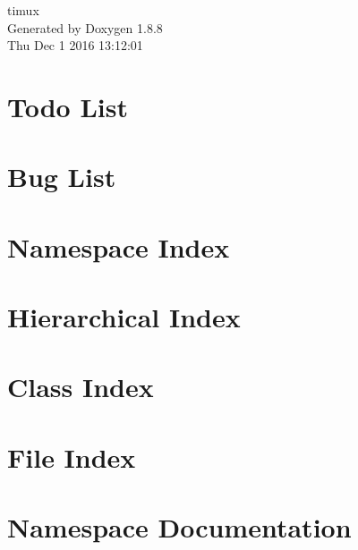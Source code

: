 \documentclass[twoside]{book}
\newcommand{\+}{\discretionary{\mbox{\scriptsize$\hookleftarrow$}}{}{}}
\newcommand{\clearemptydoublepage}{%
  \newpage{\pagestyle{empty}\cleardoublepage}%
}
\begin{document}
\hypersetup{pageanchor=false,
             bookmarks=true,
             bookmarksnumbered=true,
             pdfencoding=unicode
            }
\begin{titlepage}
\vspace*{7cm}
\begin{center}%
{\Large timux }\\
\vspace*{1cm}
{\large Generated by Doxygen 1.8.8}\\
\vspace*{0.5cm}
{\small Thu Dec 1 2016 13:12:01}\\
\end{center}
\end{titlepage}
\clearemptydoublepage
\tableofcontents
\clearemptydoublepage
{}
\hypersetup{pageanchor=true}

\chapter{Todo List}
\label{todo}
\hypertarget{todo}{}

\chapter{Bug List}
\label{bug}
\hypertarget{bug}{}

\chapter{Namespace Index}

\chapter{Hierarchical Index}

\chapter{Class Index}

\chapter{File Index}

\chapter{Namespace Documentation}





\end{document}

